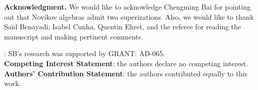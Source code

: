 \documentclass[12pt]{amsart}
\begin{document}

\vspace{2mm}

{\bf Acknowledgment.} We would like to acknowledge Chengming Bai for pointing out that Novikov algebras admit two superizations. Also, we would like to thank Sa\"id Benayadi, Isabel Cunha, Quentin Ehret, and the referee for reading the manuscript and making pertinent comments.\\

 
\bigskip

:  SB's research was supported by GRANT: AD-065. \\
{\bf Competing Interest Statement}: the authors declare no competing interest. \\
{\bf Authors' Contribution Statement}: the authors contributed equally to this work.

\end{document}
